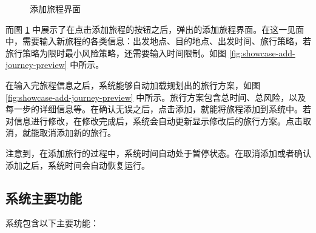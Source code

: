 \begin{figure}[t]
	\centering
	\caption{添加旅程界面}
	\label{fig:showcase-2}
\end{figure}

而图 \ref{fig:showcase-2} 中展示了在点击添加旅程的按钮之后，弹出的添加旅程界面。在这一见面中，需要输入新旅程的各类信息：出发地点、目的地点、出发时间、旅行策略，若旅行策略为限时最小风险策略，还需要输入时间限制。如图 \ref{fig:showcase-add-journey-preview} 中所示。

在输入完旅程信息之后，系统能够自动加载规划出的旅行方案，如图 \ref{fig:showcase-add-journey-preview} 中所示。旅行方案包含总时间、总风险，以及每一步的详细信息等。在确认无误之后，点击添加，就能将旅程添加到系统中。若对信息进行修改，在修改完成后，系统会自动更新显示修改后的旅行方案。点击取消，就能取消添加新的旅行。

注意到，在添加旅行的过程中，系统时间自动处于暂停状态。在取消添加或者确认添加之后，系统时间会自动恢复运行。

\subsection{系统主要功能}

系统包含以下主要功能：



